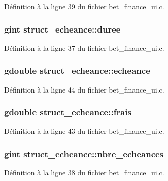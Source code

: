 Définition à la ligne 39 du fichier bet\_\-finance\_\-ui.c.

\subsubsection[{duree}]{\setlength{\rightskip}{0pt plus 5cm}gint {\bf struct\_\-echeance::duree}}\label{structstruct__echeance_aa33265f984043015aa726cd316c249cb}


Définition à la ligne 37 du fichier bet\_\-finance\_\-ui.c.

\subsubsection[{echeance}]{\setlength{\rightskip}{0pt plus 5cm}gdouble {\bf struct\_\-echeance::echeance}}\label{structstruct__echeance_aa1e7e5301b96b26a714ed27a26fb2f95}


Définition à la ligne 44 du fichier bet\_\-finance\_\-ui.c.

\subsubsection[{frais}]{\setlength{\rightskip}{0pt plus 5cm}gdouble {\bf struct\_\-echeance::frais}}\label{structstruct__echeance_a523258cf7930b0273f53befedc2afab4}


Définition à la ligne 43 du fichier bet\_\-finance\_\-ui.c.

\subsubsection[{nbre\_\-echeances}]{\setlength{\rightskip}{0pt plus 5cm}gint {\bf struct\_\-echeance::nbre\_\-echeances}}\label{structstruct__echeance_a93d435c53306d2abf3bd45dc272834b5}


Définition à la ligne 38 du fichier bet\_\-finance\_\-ui.c.

